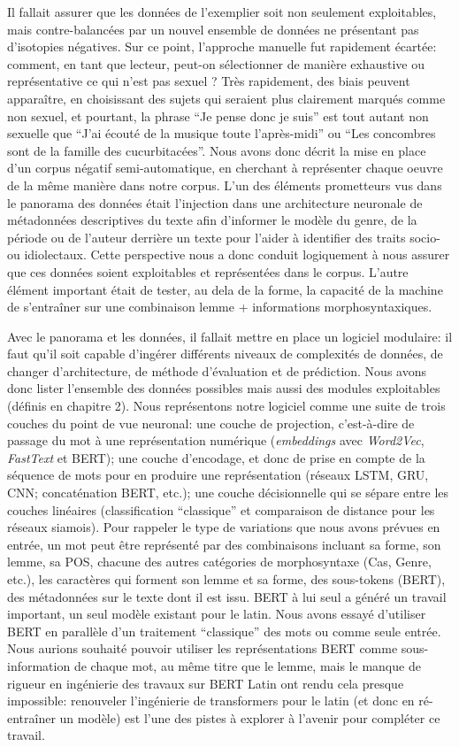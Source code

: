 Il fallait assurer que les données de l'exemplier soit non seulement exploitables, mais contre-balancées par un nouvel ensemble de données ne présentant pas d'isotopies négatives. Sur ce point, l'approche manuelle fut rapidement écartée: comment, en tant que lecteur, peut-on sélectionner de manière exhaustive ou représentative ce qui n'est pas sexuel ? Très rapidement, des biais peuvent apparaître, en choisissant des sujets qui seraient plus clairement marqués comme non sexuel, et pourtant, la phrase \enquote{Je pense donc je suis} est tout autant non sexuelle que \enquote{J'ai écouté de la musique toute l'après-midi} ou \enquote{Les concombres sont de la famille des cucurbitacées}. Nous avons donc décrit la mise en place d'un corpus négatif semi-automatique, en cherchant à représenter chaque oeuvre de la même manière dans notre corpus. L'un des éléments prometteurs vus dans le panorama des données était l'injection dans une architecture neuronale de métadonnées descriptives du texte afin d'informer le modèle du genre, de la période ou de l'auteur derrière un texte pour l'aider à identifier des traits socio- ou idiolectaux. Cette perspective nous a donc conduit logiquement à nous assurer que ces données soient exploitables et représentées dans le corpus. L'autre élément important était de tester, au dela de la forme, la capacité de la machine de s'entraîner sur une combinaison lemme + informations morphosyntaxiques.

Avec le panorama et les données, il fallait mettre en place un logiciel modulaire: il faut qu'il soit capable d'ingérer différents niveaux de complexités de données, de changer d'architecture, de méthode d'évaluation et de prédiction. Nous avons donc lister l'ensemble des données possibles mais aussi des modules exploitables (définis en chapitre 2). Nous représentons notre logiciel comme une suite de trois couches du point de vue neuronal: une couche de projection, c'est-à-dire de passage du mot à une représentation numérique (\textit{embeddings} avec \textit{Word2Vec}, \textit{FastText} et BERT); une couche d'encodage, et donc de prise en compte de la séquence de mots pour en produire une représentation (réseaux LSTM, GRU, CNN; concaténation BERT, etc.); une couche décisionnelle qui se sépare entre les couches linéaires (classification \enquote{classique} et comparaison de distance pour les réseaux siamois). Pour rappeler le type de variations que nous avons prévues en entrée, un mot peut être représenté par des combinaisons incluant sa forme, son lemme, sa POS, chacune des autres catégories de morphosyntaxe (Cas, Genre, etc.), les caractères qui forment son lemme et sa forme, des sous-tokens (BERT), des métadonnées sur le texte dont il est issu. BERT à lui seul a généré un travail important, un seul modèle existant pour le latin. Nous avons essayé d'utiliser BERT en parallèle d'un traitement \enquote{classique} des mots ou comme seule entrée. Nous aurions souhaité pouvoir utiliser les représentations BERT comme sous-information de chaque mot, au même titre que le lemme, mais le manque de rigueur en ingénierie des travaux sur BERT Latin ont rendu cela presque impossible: renouveler l'ingénierie de transformers pour le latin (et donc en ré-entraîner un modèle) est l'une des pistes à explorer à l'avenir pour compléter ce travail.


